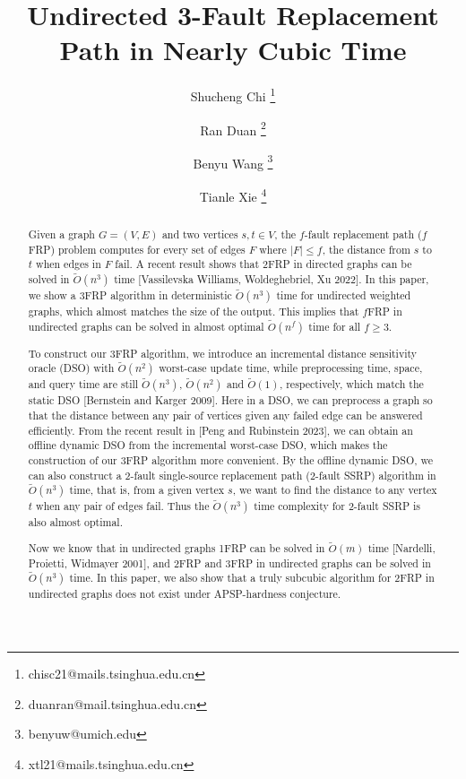 \documentclass[11pt]{article}
\theoremstyle{plain}
\theoremstyle{definition}
\begin{document}
\title{Undirected 3-Fault Replacement Path in Nearly Cubic Time}






\author[1]{Shucheng Chi \thanks{chisc21@mails.tsinghua.edu.cn}}
\author[1]{Ran Duan \thanks{duanran@mail.tsinghua.edu.cn}}
\author[2]{Benyu Wang \thanks{benyuw@umich.edu}}
\author[1]{Tianle Xie \thanks{xtl21@mails.tsinghua.edu.cn}}







\maketitle
\begin{abstract}
Given a graph $G=(V,E)$ and two vertices $s,t\in V$, the $f$-fault replacement path ($f$FRP) problem computes for every set of edges $F$ where $|F|\leq f$, the distance from $s$ to $t$ when edges in $F$ fail. A recent result shows that 2FRP in directed graphs can be solved in $\tilde{O}(n^3)$ time [Vassilevska Williams, Woldeghebriel, Xu 2022]. In this paper, we show a 3FRP algorithm in deterministic $\tilde{O}(n^3)$ time for undirected weighted graphs, which almost matches the size of the output. This implies that $f$FRP in undirected graphs can be solved in almost optimal $\tilde{O}(n^f)$ time for all $f\geq 3$.

To construct our 3FRP algorithm, we introduce an incremental distance sensitivity oracle (DSO) with $\tilde{O}(n^2)$ worst-case update time, while preprocessing time, space, and query time are still $\tilde{O}(n^3)$, $\tilde{O}(n^2)$ and $\tilde{O}(1)$, respectively, which match the static DSO [Bernstein and Karger 2009]. Here in a DSO, we can preprocess a graph so that the distance between any pair of vertices given any failed edge can be answered efficiently. From the recent result in [Peng and Rubinstein 2023], we can obtain an offline dynamic DSO from the incremental worst-case DSO, which makes the construction of our 3FRP algorithm more convenient. By the offline dynamic DSO, we can also construct a 2-fault single-source replacement path (2-fault SSRP) algorithm in $\tilde{O}(n^3)$ time, that is, from a given vertex $s$, we want to find the distance to any vertex $t$ when any pair of edges fail. Thus the $\tilde{O}(n^3)$ time complexity for 2-fault SSRP is also almost optimal.

Now we know that in undirected graphs 1FRP can be solved in $\tilde{O}(m)$ time [Nardelli, Proietti, Widmayer 2001], and 2FRP and 3FRP in undirected graphs can be solved in $\tilde{O}(n^3)$ time. In this paper, we also show that a truly subcubic algorithm for 2FRP in undirected graphs does not exist under APSP-hardness conjecture.
\end{abstract}
\end{document}
